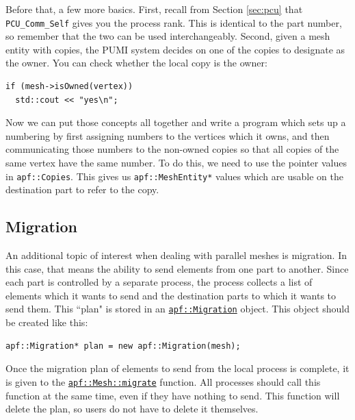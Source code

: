 \documentclass{article}
\begin{document}
Before that, a few more basics.
First, recall from Section \ref{sec:pcu} that \texttt{PCU\_Comm\_Self}
gives you the process rank.
This is identical to the part number, so remember that the two
can be used interchangeably.
Second, given a mesh entity with copies, the PUMI system decides
on one of the copies to designate as the owner.
You can check whether the local copy is the owner:

\begin{lstlisting}
if (mesh->isOwned(vertex))
  std::cout << "yes\n";
\end{lstlisting}

Now we can put those concepts all together and write a program
which sets up a numbering by first assigning numbers to
the vertices which it owns, and then communicating those
numbers to the non-owned copies so that all copies
of the same vertex have the same number.
To do this, we need to use the pointer values in \texttt{apf::Copies}.
This gives us \texttt{apf::MeshEntity*} values which are usable
on the destination part to refer to the copy.



\subsection{Migration}

An additional topic of interest when dealing with parallel
meshes is migration.
In this case, that means the ability to send elements
from one part to another.
Since each part is controlled by a separate process,
the process collects a list of elements which it
wants to send and the destination parts to which
it wants to send them.
This ``plan" is stored in an
\href{http://scorec.rpi.edu/~dibanez/core/classapf_1_1Migration.html}{\texttt{apf::Migration}}
object.
This object should be created like this:

\begin{lstlisting}
apf::Migration* plan = new apf::Migration(mesh);
\end{lstlisting}

Once the migration plan of elements to send from
the local process is complete, it is given to the
\href{http://scorec.rpi.edu/~dibanez/core/classapf_1_1Mesh.html#ab67d6bf48b14aec7a7d85d31e061410d}{\texttt{apf::Mesh::migrate}}
function.
All processes should call this function at the
same time, even if they have nothing to send.
This function will delete the plan, so users
do not have to delete it themselves.
\end{document}
